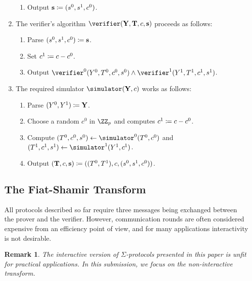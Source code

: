 \documentclass[runningheads,11pt]{article}
\newtheorem{remark}{Remark}
\begin{document}
\begin{enumerate}
\begin{enumerate}
      \item
        Output $\mathbf {s}\coloneqq(s^0,s^1, c^0)$.
    \end{enumerate}
  \item
    The verifier's algorithm $\verifier(\vec \statement, \vec \commitment,\challenge,\vec \response)$ proceeds as follows:
    \begin{enumerate}
      \item
        Parse $(s^0, s^1, c^0)\coloneqq \mathbf {s}$.
      \item
        Set $c^1\coloneqq c-c^0$.
      \item
	    Output $\verifier^0(\statement^0, \commitment^0,c^0,s^0)\land\verifier^1(\statement^1, \commitment^1,c^1,s^1)$.
    \end{enumerate}
  \item
    The required simulator $\simulator(\vec Y,c)$ works as follows:
    \begin{enumerate}
      \item
        Parse $(Y^0,Y^1)\coloneqq \mathbf {Y}$.
      \item
        Choose a random $c^0$ in $\ZZ_p$ and computes $c^1\coloneqq c-c^0$.
      \item
        Compute $(\commitment^0,\challenge^0, \response^0)\gets\simulator^0(\commitment^0,\challenge^0)$ and $(\commitment^1,\challenge^1,\response^1)\gets\simulator^1(\statement^1,\challenge^1)$.
      \item
        Output $(\mathbf {T},c,\mathbf s)\coloneqq ((T^0,T^1),c,(s^0,s^1,c^0))$.
    \end{enumerate}
\end{enumerate}

\subsection{The Fiat-Shamir Transform}\label{sec:fs}
All protocols described so far require three messages being exchanged between the prover and the verifier.
However, communication rounds are often considered expensive from an efficiency point of view, and for many applications interactivity is not desirable.

\begin{remark}
The interactive version of $\Sigma$-protocols presented in this paper is unfit for practical applications.
 In this submission, we focus on the non-interactive transform.
\end{remark}
\end{document}

